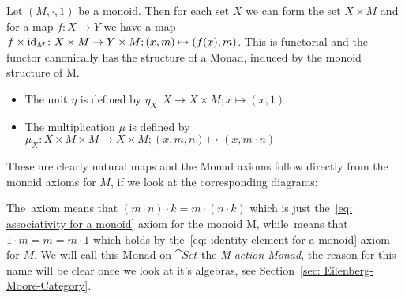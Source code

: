 \begin{example}
    Let $(M,\cdot,1)$ be a monoid. Then for each set $X$ we can form the set $X \times M$ and 
    for a map $f \colon X \to Y$ we have a map $f \times \operatorname{id}_M \colon X \times M \to Y \times M;
    (x,m) \mapsto (f(x),m)$. This is functorial and the functor canonically has the structure of 
    a Monad, induced by the monoid structure of M. 
    \begin{itemize}
        \item The unit $\eta$ is defined by
            $\eta_X \colon X \to X \times M;
            x \mapsto (x,1)$
        \item The multiplication $\mu$ is defined by 
           $ \mu_X \colon X \times M \times M \to X \times M;
            (x,m,n) \mapsto (x,m \cdot n)$
    \end{itemize}
    These are clearly natural maps and the Monad axioms follow directly from the monoid axioms for $M$,
    if we look at the corresponding diagrams:
    \begin{figure}[H]
    \centering
    \begin{subfigure}{0.4\textwidth}
    \centering 
    \end{subfigure}
    \hspace{2em}
    \begin{subfigure}{0.4\textwidth}
    \centering
    \end{subfigure}
    \end{figure}
    The~ axiom means that $(m \cdot n) \cdot k = m \cdot (n \cdot k)$ 
    which is just the~\ref{eq: associativity for a monoid} axiom for the monoid M,
    while~ means that $1\cdot m = m = m \cdot 1$ which holds by
    the~\ref{eq: identity element for a monoid} axiom for $M$.
    We will call this Monad on $\cat{Set}$ the \textit{M-action Monad}, the reason for this name will
    be clear once we look at it's algebras, see Section~\ref{sec: Eilenberg-Moore-Category}.
\end{example}
